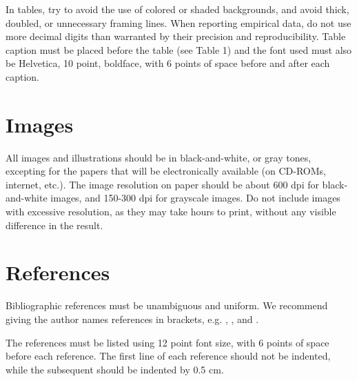 \documentclass[12pt]{article}
\begin{document}

In tables, try to avoid the use of colored or shaded backgrounds, and avoid
thick, doubled, or unnecessary framing lines. When reporting empirical data,
do not use more decimal digits than warranted by their precision and
reproducibility. Table caption must be placed before the table (see Table 1)
and the font used must also be Helvetica, 10 point, boldface, with 6 points of
space before and after each caption.


\section{Images}

All images and illustrations should be in black-and-white, or gray tones,
excepting for the papers that will be electronically available (on CD-ROMs,
internet, etc.). The image resolution on paper should be about 600 dpi for
black-and-white images, and 150-300 dpi for grayscale images.  Do not include
images with excessive resolution, as they may take hours to print, without any
visible difference in the result. 

\section{References}

Bibliographic references must be unambiguous and uniform.  We recommend giving
the author names references in brackets, e.g. \cite{knuth:84},
\cite{boulic:91}, and \cite{smith:99}.

The references must be listed using 12 point font size, with 6 points of space
before each reference. The first line of each reference should not be
indented, while the subsequent should be indented by 0.5 cm.



\end{document}

